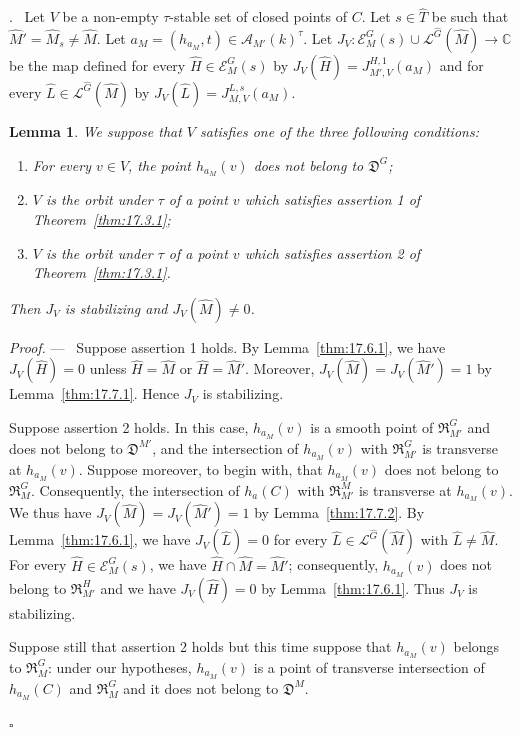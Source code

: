 \documentclass[12pt,a4paper,oneside,english,leqno]{smfart}
\makeatletter
\numberwithin{equation}{subsection}
\newcounter{theo}
\numberwithin{theo}{subsection}
\newenvironment{paragr}[1][]{\medskip\refstepcounter{subsection}%
  \par\noindent\hspace*{\parindent}\thesubsection.\ \emph{#1}%
  \@ifundefined{@empty}{}{}\ignorespaces}{\medskip}
\theoremstyle{plain}
\newtheorem{lemma}[theo]{Lemma}
\theoremstyle{definition}
\theoremstyle{remark}
\newenvironment{preuve}[1][]{\medskip\noindent\textit{Proof.} #1 ---\ }%
  {\hfill\ensuremath{\square}\medskip}
\newcommand{\CC}{\mathbb{C}}
\newcommand{\ec}{\mathcal{E}}
\newcommand{\lc}{\mathcal{L}}
\newcommand{\Ac}{\mathcal{A}}
\newcommand{\Gc}{\widehat{G}}
\newcommand{\Tc}{\widehat{T}}
\newcommand{\Mc}{\widehat{M}}
\newcommand{\Lc}{\widehat{L}}
\newcommand{\Hc}{\widehat{H}}
\makeatother
\begin{document}
\begin{paragr}\label{S:17.8}
Let $V$ be a non-empty $\tau$-stable set of closed points of $C$. Let $s\in\Tc$ be such that $\Mc'=\Mc_s\neq\Mc$. Let $a_M=(h_{a_M},t)\in\Ac_{M'}(k)^\tau$. Let $J_V:\ec^G_M(s)\cup\lc^{\Gc}(\Mc)\to\CC$ be the map defined for every $\Hc\in\ec^G_M(s)$ by $J_V(\Hc)=J^{H,1}_{M',V}(a_M)$ and for every $\Lc\in\lc^{\Gc}(\Mc)$ by $J_V(\Lc)=J^{L,s}_{M,V}(a_M)$.

\begin{lemma}\label{thm:17.8.1}
We suppose that $V$ satisfies one of the three following conditions{\rm :}
\begin{enumerate}
\item For every $v\in V$, the point $h_{a_M}(v)$ does not belong to $\mathfrak{D}^G${\rm ;} \item $V$ is the orbit under $\tau$ of a point $v$ which satisfies assertion 1 of Theorem~\ref{thm:17.3.1}{\rm ;} \item $V$ is the orbit under $\tau$ of a point $v$ which satisfies assertion 2 of Theorem~\ref{thm:17.3.1}.
\end{enumerate}
Then $J_V$ is stabilizing and $J_V(\Mc)\neq 0$.
\end{lemma}

\begin{preuve}
Suppose assertion 1 holds. By Lemma~\ref{thm:17.6.1}, we have $J_V(\Hc)=0$ unless $\Hc=\Mc$ or $\Hc=\Mc'$. Moreover, $J_V(\Mc)=J_V(\Mc')=1$ by Lemma~\ref{thm:17.7.1}. Hence $J_V$ is stabilizing.

Suppose assertion 2 holds. In this case, $h_{a_M}(v)$ is a smooth point of $\mathfrak{R}^G_{M'}$ and does not belong to $\mathfrak{D}^{M'}$, and the intersection of $h_{a_M}(v)$ with $\mathfrak{R}^G_{M'}$ is transverse at $h_{a_M}(v)$. Suppose moreover, to begin with, that $h_{a_M}(v)$ does not belong to $\mathfrak{R}^G_M$. Consequently, the intersection of $h_a(C)$ with $\mathfrak{R}^M_{M'}$ is transverse at $h_{a_M}(v)$. We thus have $J_V(\Mc)=J_V(\Mc')=1$ by Lemma~\ref{thm:17.7.2}. By Lemma~\ref{thm:17.6.1}, we have $J_V(\Lc)=0$ for every $\Lc\in\lc^{\Gc}(\Mc)$ with $\Lc\neq\Mc$. For every $\Hc\in\ec^G_M(s)$, we have $\Hc\cap\Mc=\Mc'$; consequently, $h_{a_M}(v)$ does not belong to $\mathfrak{R}^H_{M'}$ and we have $J_V(\Hc)=0$ by Lemma~\ref{thm:17.6.1}. Thus $J_V$ is stabilizing.

Suppose still that assertion 2 holds but this time suppose that $h_{a_M}(v)$ belongs to $\mathfrak{R}^G_M$: under our hypotheses, $h_{a_M}(v)$ is a point of transverse intersection of $h_{a_M}(C)$ and $\mathfrak{R}^G_M$ and it does not belong to $\mathfrak{D}^M$.


\end{preuve}
\end{paragr}
\end{document}
